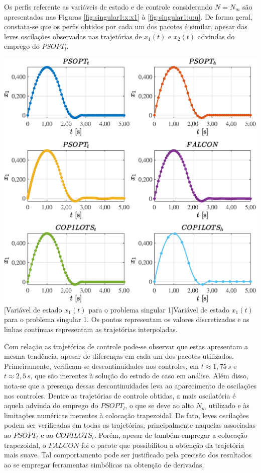 Os perfis referente as variáveis de estado e de controle considerando $ N = N_m $ são apresentadas nas Figuras \ref{fig:singular1:x:x1} à  \ref{fig:singular1:u:u}. De forma geral, constata-se que os perfis obtidos por cada um dos pacotes é similar, apesar das leves oscilações observadas nas trajetórias de $ x_1(t) $ e $ x_2(t) $ advindas do emprego do $ PSOPT_l $. 

\noindent
\begin{minipage}{\textwidth}
	\vspace{\onelineskip}
	\centering
	\includegraphics[scale=0.7]{fig/resultados/singular1/traj/x/x_1}
	[Variável de estado $x_1(t)$ para o problema singular 1]{Variável de estado $x_1(t)$ para o problema singular 1. Os pontos representam os valores discretizados e as linhas contínuas representam as trajetórias interpoladas.}
	\label{fig:singular1:x:x1}
	\vspace{\onelineskip}
\end{minipage}

Com relação as trajetórias de controle pode-se observar que estas apresentam a mesma tendência, apesar de diferenças em cada um dos pacotes utilizados. Primeiramente, verificam-se descontinuidades nos controles,  em $ t \approx 1,75 \, s $ e $ t \approx 2,5 \, s $, que são inerentes à solução do estudo de caso em análise. Além disso, nota-se que a presença dessas descontinuidades leva ao aparecimento de oscilações nos controles. Dentre as trajetórias de controle obtidas, a mais oscilatória é aquela advinda do emprego do $ PSOPT_l $, o que se deve ao alto $ N_m $ utilizado e às limitações numéricas inerentes à colocação trapezoidal. De fato, leves oscilações podem ser verificadas em todas as trajetórias, principalmente naquelas associadas ao $ PSOPT_t $ e ao $ COPILOTS_t $. Porém, apesar de também empregar a colocação trapezoidal, o $ FALCON $ foi o pacote que possibilitou a obtenção da trajetória mais suave. Tal comportamento pode ser justificado pela precisão dos resultados ao se empregar  ferramentas simbólicas na obtenção de derivadas.

